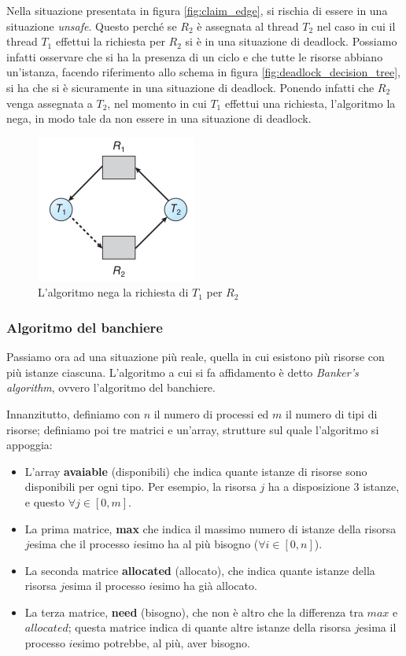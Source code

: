 Nella situazione presentata in figura \ref{fig:claim_edge}, si rischia di essere in una situazione \textit{unsafe}. Questo perché se $R_2$ è assegnata al thread $T_2$ nel caso in cui il thread $T_1$ effettui la richiesta per $R_2$ si è in una situazione di deadlock. Possiamo infatti osservare che si ha la presenza di un ciclo e che tutte le risorse abbiano un'istanza, facendo riferimento allo schema in figura \ref{fig:deadlock_decision_tree}, si ha che si è sicuramente in una situazione di deadlock. Ponendo infatti che $R_2$ venga assegnata a $T_2$, nel momento in cui $T_1$ effettui una richiesta, l'algoritmo la nega, in modo tale da non essere in una situazione di deadlock.
\begin{figure}[h]
    \centering
    \includegraphics[width = .4\textwidth]{../res/imgs/deadlocks/request_denied.png}
    \caption{L'algoritmo nega la richiesta di $T_1$ per $R_2$}
    \label{fig:request_denied}
\end{figure}
% 
\subsubsection{Algoritmo del banchiere}
Passiamo ora ad una situazione più reale, quella in cui esistono più risorse con più istanze ciascuna. L'algoritmo a cui si fa affidamento è detto \textit{Banker's algorithm}, ovvero l'algoritmo del banchiere.

Innanzitutto, definiamo con $n$ il numero di processi ed $m$ il numero di tipi di risorse; definiamo poi tre matrici e un'array, strutture sul quale l'algoritmo si appoggia:
\vspace{-15pt}
\begin{itemize}
\setlength{\itemsep}{-.15 em}
    \item L'array \textbf{avaiable} (disponibili) che indica quante istanze di risorse sono disponibili per ogni tipo. Per esempio, la risorsa $j$ ha a disposizione 3 istanze, e questo $\forall j\in[0,m]$.
    \item La prima matrice, \textbf{max} che indica il massimo numero di istanze della risorsa $j$esima che il processo $i$esimo ha al più bisogno ($\forall i\in[0,n]$).
    \item La seconda matrice \textbf{allocated} (allocato), che indica quante istanze della risorsa $j$esima il processo $i$esimo ha già allocato.
    \item La terza matrice, \textbf{need} (bisogno), che non è altro che la differenza tra $max$ e $allocated$; questa matrice indica di quante altre istanze della risorsa $j$esima il processo $i$esimo potrebbe, al più, aver bisogno.
\end{itemize}

